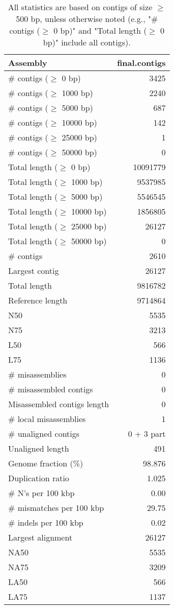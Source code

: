 \documentclass[12pt,a4paper]{article}
\begin{document}
\begin{table}[ht]
\begin{center}
\caption{All statistics are based on contigs of size $\geq$ 500 bp, unless otherwise noted (e.g., "\# contigs ($\geq$ 0 bp)" and "Total length ($\geq$ 0 bp)" include all contigs).}
\begin{tabular}{|l*{1}{|r}|}
\hline
Assembly & final.contigs \\ \hline
\# contigs ($\geq$ 0 bp) & 3425 \\ \hline
\# contigs ($\geq$ 1000 bp) & 2240 \\ \hline
\# contigs ($\geq$ 5000 bp) & 687 \\ \hline
\# contigs ($\geq$ 10000 bp) & 142 \\ \hline
\# contigs ($\geq$ 25000 bp) & 1 \\ \hline
\# contigs ($\geq$ 50000 bp) & 0 \\ \hline
Total length ($\geq$ 0 bp) & 10091779 \\ \hline
Total length ($\geq$ 1000 bp) & 9537985 \\ \hline
Total length ($\geq$ 5000 bp) & 5546545 \\ \hline
Total length ($\geq$ 10000 bp) & 1856805 \\ \hline
Total length ($\geq$ 25000 bp) & 26127 \\ \hline
Total length ($\geq$ 50000 bp) & 0 \\ \hline
\# contigs & 2610 \\ \hline
Largest contig & 26127 \\ \hline
Total length & 9816782 \\ \hline
Reference length & 9714864 \\ \hline
N50 & 5535 \\ \hline
N75 & 3213 \\ \hline
L50 & 566 \\ \hline
L75 & 1136 \\ \hline
\# misassemblies & 0 \\ \hline
\# misassembled contigs & 0 \\ \hline
Misassembled contigs length & 0 \\ \hline
\# local misassemblies & 1 \\ \hline
\# unaligned contigs & 0 + 3 part \\ \hline
Unaligned length & 491 \\ \hline
Genome fraction (\%) & 98.876 \\ \hline
Duplication ratio & 1.025 \\ \hline
\# N's per 100 kbp & 0.00 \\ \hline
\# mismatches per 100 kbp & 29.75 \\ \hline
\# indels per 100 kbp & 0.02 \\ \hline
Largest alignment & 26127 \\ \hline
NA50 & 5535 \\ \hline
NA75 & 3209 \\ \hline
LA50 & 566 \\ \hline
LA75 & 1137 \\ \hline
\end{tabular}
\end{center}
\end{table}
\end{document}
